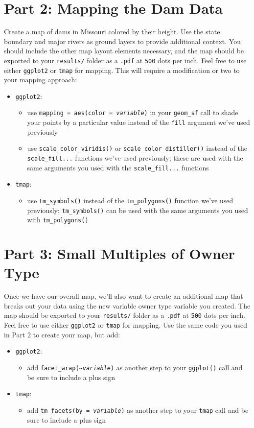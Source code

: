 \documentclass{tufte-handout}
\begin{document}
\section{Part 2: Mapping the Dam Data}
Create a map of dams in Missouri colored by their height. Use the state boundary and major rivers as ground layers to provide additional context. You should include the other map layout elements necessary, and the map should be exported to your \texttt{results/} folder as a \texttt{.pdf} at \texttt{500} dots per inch. Feel free to use either \texttt{ggplot2} or \texttt{tmap} for mapping. This will require a modification or two to your mapping approach:
\begin{itemize}
\item \texttt{ggplot2}:
\begin{itemize}
\item use \texttt{mapping = aes(color = \textit{variable})} in your \texttt{geom\_sf} call to shade your points by a particular value instead of the \texttt{fill} argument we've used previously
\item use \texttt{scale\_color\_viridis()} or \texttt{scale\_color\_distiller()} instead of the \texttt{scale\_fill...} functions we've used previously; these are used with the same arguments you used with the \texttt{scale\_fill...} functions
\end{itemize}
\item \texttt{tmap}:
\begin{itemize}
\item use \texttt{tm\_symbols()} instead of the \texttt{tm\_polygons()} function we've used previously; \texttt{tm\_symbols()} can be used with the same arguments you used with \texttt{tm\_polygons()}
\end{itemize}
\end{itemize}

\newpage
\section{Part 3: Small Multiples of Owner Type}
Once we have our overall map, we'll also want to create an additional map that breaks out your data using the new variable owner type variable you created. The map should be exported to your \texttt{results/} folder as a \texttt{.pdf} at \texttt{500} dots per inch. Feel free to use either \texttt{ggplot2} or \texttt{tmap} for mapping. Use the same code you used in Part 2 to create your map, but add:
\begin{itemize}
\item \texttt{ggplot2}:
\begin{itemize}
\item add \texttt{facet\_wrap(\textasciitilde\textit{variable})} as another step to your \texttt{ggplot()} call and be sure to include a plus sign
\end{itemize}
\item \texttt{tmap}:
\begin{itemize}
\item add \texttt{tm\_facets(by = \textit{variable})} as another step to your \texttt{tmap} call and be sure to include a plus sign
\end{itemize}
\end{itemize}
\end{document}
